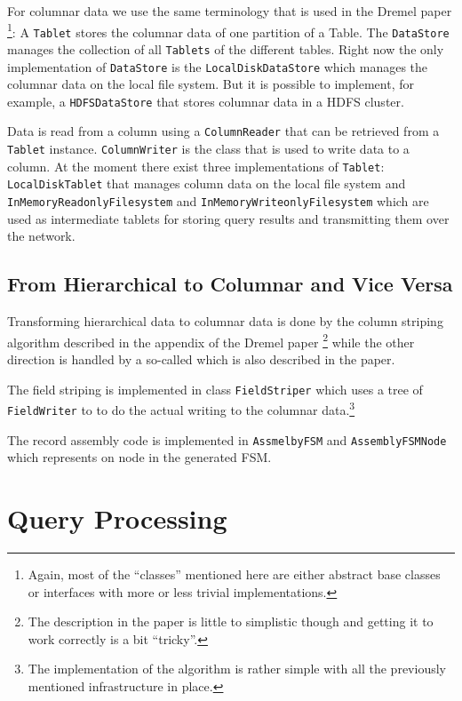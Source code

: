 For columnar data we use the same terminology that is used in the Dremel
paper \cite{melnik2010dremel}\footnote{Again, most of the ``classes''
mentioned here are either abstract base classes or interfaces with more
or less trivial implementations.}: A \texttt{Tablet} stores the columnar
data of one partition of a Table. The \texttt{DataStore} manages
the collection of all \texttt{Tablets} of the different tables. Right
now the only implementation of \texttt{DataStore} is the \texttt{LocalDiskDataStore}
which manages the columnar data on the local file system. But it is possible
to implement, for example, a \texttt{HDFSDataStore} that stores columnar
data in a HDFS cluster.

Data is read from a column using a \texttt{ColumnReader} that can be
retrieved from a \texttt{Tablet} instance. \texttt{ColumnWriter} is the
class that is used to write data to a column. At the moment there exist
three implementations of \texttt{Tablet}: \texttt{LocalDiskTablet} that
manages column data on the local file system and
\texttt{InMemoryReadonlyFilesystem} and \texttt{InMemoryWriteonlyFilesystem}
which are used as intermediate tablets for storing query results and
transmitting them over the network.

\subsection{From Hierarchical to Columnar and Vice Versa}
\label{sec:transform}

Transforming hierarchical data to columnar data is done by the column
striping algorithm described in the appendix of the Dremel paper
\footnote{The description in the paper is little
to simplistic though and getting it to work correctly is a bit ``tricky''.}
\cite{melnik2010dremel}
while the other direction is handled by a so-called  which
is also described in the paper.

The field striping is implemented in class \texttt{FieldStriper} which
uses a tree of \texttt{FieldWriter} to to do the actual writing to
the columnar data.\footnote{The implementation of the algorithm is rather
simple with all the previously mentioned infrastructure in place.}

The record assembly code is implemented in \texttt{AssmelbyFSM} and
\texttt{AssemblyFSMNode} which represents on node in the generated FSM.


\section{Query Processing}

